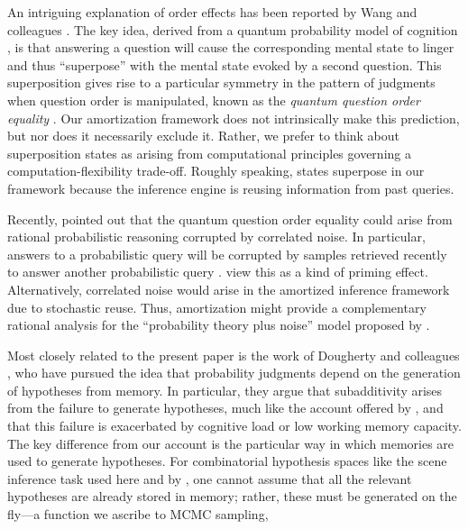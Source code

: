 An intriguing explanation of order effects has been reported by Wang and colleagues \citep{wang2013quantum,wang2014context}. The key idea, derived from a quantum probability model of cognition \citep[see also][]{trueblood2011quantum}, is that answering a question will cause the corresponding mental state to linger and thus ``superpose'' with the mental state evoked by a second question. This superposition gives rise to a particular symmetry in the pattern of judgments when question order is manipulated, known as the \emph{quantum question order equality} \citep[see][for details]{wang2013quantum}. Our amortization framework does not intrinsically make this prediction, but nor does it necessarily exclude it. Rather, we prefer to think about superposition states as arising from computational principles governing a computation-flexibility trade-off. Roughly speaking, states superpose in our framework because the inference engine is reusing information from past queries.

Recently, \citet{costello18} pointed out that the quantum question order equality could arise from rational probabilistic reasoning corrupted by correlated noise. In particular, answers to a probabilistic query will be corrupted by samples retrieved recently to answer another probabilistic query \citep[similar to the concept of ``overgeneralization'' in probabilistic estimation, as developed in][]{marchiori15}. \citet{costello18} view this as a kind of priming effect. Alternatively, correlated noise would arise in the amortized inference framework due to stochastic reuse. Thus, amortization might provide a complementary rational analysis for the ``probability theory plus noise'' model proposed by \citet{costello18}.

Most closely related to the present paper is the work of Dougherty and colleagues \citep{Dougherty1999,Thomas2008,thomas2014memory,dougherty2003hypothesis,dougherty2003probability}, who have pursued the idea that probability judgments depend on the generation of hypotheses from memory. In particular, they argue that subadditivity arises from the failure to generate hypotheses, much like the account offered by \citet{dasgupta17}, and that this failure is exacerbated by cognitive load or low working memory capacity. The key difference from our account is the particular way in which memories are used to generate hypotheses. For combinatorial hypothesis spaces like the scene inference task used here and by \citet{dasgupta17}, one cannot assume that all the relevant hypotheses are already stored in memory; rather, these must be generated on the fly---a function we ascribe to MCMC sampling, 

